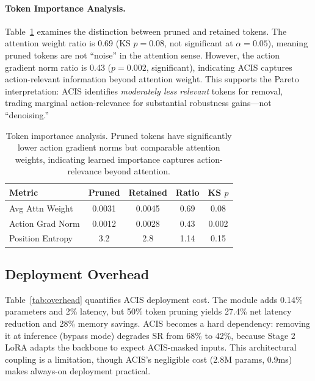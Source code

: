 \documentclass[10pt,twocolumn]{article}
\begin{document}
\paragraph{Token Importance Analysis.}
Table~\ref{tab:token_analysis} examines the distinction between pruned and retained tokens. The attention weight ratio is 0.69 (KS $p{=}0.08$, not significant at $\alpha{=}0.05$), meaning pruned tokens are not ``noise'' in the attention sense. However, the action gradient norm ratio is 0.43 ($p{=}0.002$, significant), indicating ACIS captures action-relevant information beyond attention weight. This supports the Pareto interpretation: ACIS identifies \emph{moderately less relevant} tokens for removal, trading marginal action-relevance for substantial robustness gains---not ``denoising.''

\begin{table}[t]
\centering
\caption{Token importance analysis. Pruned tokens have significantly lower action gradient norms but comparable attention weights, indicating learned importance captures action-relevance beyond attention.}
\label{tab:token_analysis}
\small
\begin{tabular}{@{}lcccc@{}}
\toprule
Metric & Pruned & Retained & Ratio & KS $p$ \\
\midrule
Avg Attn Weight & 0.0031 & 0.0045 & 0.69 & 0.08 \\
Action Grad Norm & 0.0012 & 0.0028 & 0.43 & 0.002 \\
Position Entropy & 3.2 & 2.8 & 1.14 & 0.15 \\
\bottomrule
\end{tabular}
\end{table}

\subsection{Deployment Overhead}
\label{sec:overhead}

Table~\ref{tab:overhead} quantifies ACIS deployment cost. The module adds 0.14\% parameters and 2\% latency, but 50\% token pruning yields 27.4\% net latency reduction and 28\% memory savings. ACIS becomes a hard dependency: removing it at inference (bypass mode) degrades SR from 68\% to 42\%, because Stage 2 LoRA adapts the backbone to expect ACIS-masked inputs. This architectural coupling is a limitation, though ACIS's negligible cost (2.8M params, 0.9ms) makes always-on deployment practical.
\end{document}

